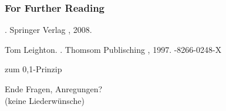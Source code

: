 \documentclass[ucs,9pt]{beamer}
\begin{document}
\begin{frame}[allowframebreaks]
  \frametitle<presentation>{For Further Reading}
    
  \begin{thebibliography}{10}
    
  \beamertemplatebookbibitems

  \bibitem{}
    .
    \newblock Springer Verlag , 2008.
    
    Tom Leighton.
    .
    \newblock Thomsom Publisching , 1997.
    -8266-0248-X
 
    
  \beamertemplatearticlebibitems

    \newblock zum 0,1-Prinzip
    
  \end{thebibliography}
\end{frame}

\begin{frame}{Ende}
    Fragen, Anregungen?\\
    (keine Liederwünsche)
\end{frame}
\end{document}
